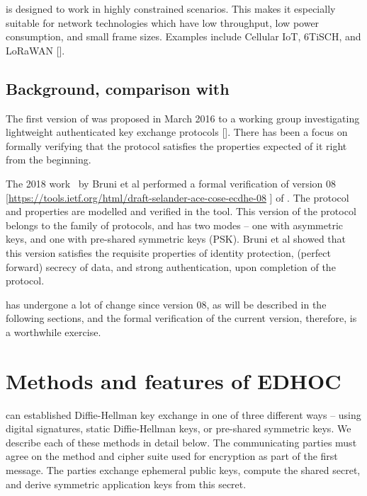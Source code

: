 \mEdhoc is designed to work in highly constrained scenarios. This makes it especially suitable for network technologies which have low throughput, low power consumption, and small frame sizes. Examples include Cellular IoT, 6TiSCH, and LoRaWAN [\mcneed].

\subsection{Background, comparison with~\cite{DBLP:conf/secsr/BruniJPS18}}
The first version of \mEdhoc was proposed in March 2016 to a working group investigating lightweight authenticated key exchange protocols [\mcneed]. There has been a focus on formally verifying that the protocol satisfies the properties expected of it right from the beginning. 

The 2018 work~\cite{DBLP:conf/secsr/BruniJPS18} by Bruni et al performed a formal verification of version 08 [\url{https://tools.ietf.org/html/draft-selander-ace-cose-ecdhe-08} \mcfix] of \mEdhoc. The protocol and properties are modelled and verified in the \mProverif tool. This version of the protocol belongs to the \mSigmaI family of protocols, and has two modes -- one with asymmetric keys, and one with pre-shared symmetric keys (PSK). Bruni et al showed that this version satisfies the requisite properties of identity protection, (perfect forward) secrecy of data, and strong authentication, upon completion of the protocol.

\mEdhoc has undergone a lot of change since version 08, as will be described in the following sections, and the formal verification of the current version, therefore, is a worthwhile exercise.

\section{Methods and features of \textsc{EDHOC}}
\mEdhoc can established Diffie-Hellman key exchange in one of three different ways -- using digital signatures, static Diffie-Hellman keys, or pre-shared symmetric keys. We describe each of these methods in detail below. The communicating parties must agree on the method and cipher suite used for encryption as part of the first message. The parties exchange ephemeral public keys, compute the shared secret, and derive symmetric application keys from this secret.

